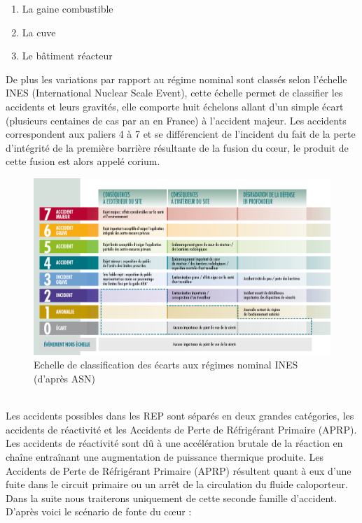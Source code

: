 \begin{enumerate}
	\item La gaine combustible
	\item La cuve
	\item Le bâtiment réacteur
\end{enumerate}
De plus les variations par rapport au régime nominal sont classés selon l'échelle INES (International Nuclear Scale Event), cette échelle permet de classifier les accidents et leurs gravités, elle comporte huit échelons allant d'un simple écart (plusieurs centaines de cas par an en France) à l'accident majeur. Les accidents correspondent aux paliers 4 à 7 et se différencient de l'incident du fait de la perte d'intégrité de la première barrière résultante de la fusion du c\oe ur, le produit de cette fusion est alors appelé corium.
\begin{figure}[h!]
	\centering
	\includegraphics[width=0.7\linewidth]{figure/echelle-ines-article}
	\caption[Echelle de classification des écarts aux régimes nominal INES]{Echelle de classification des écarts aux régimes nominal INES (d'après ASN)}
	\label{fig:echelle-ines-article}
\end{figure}\\
Les accidents possibles dans les REP sont séparés en deux grandes catégories, les accidents de réactivité et les Accidents de Perte de Réfrigérant Primaire (APRP). Les accidents de réactivité sont dû à une accélération brutale de la réaction en chaîne entraînant une augmentation de puissance thermique produite. Les Accidents de Perte de Réfrigérant Primaire (APRP) résultent quant à eux d'une fuite dans le circuit primaire ou un arrêt de la circulation du fluide caloporteur. Dans la suite nous traiterons uniquement de cette seconde famille d'accident.
D'après \cite{kolev_multiphase_2015} voici le scénario de fonte du c\oe ur :
